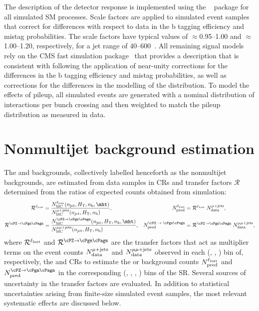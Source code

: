 The description of the detector response is implemented using the
\GEANTfour~\cite{geant} package for all simulated SM processes. Scale
factors are applied to simulated event samples that correct for
differences with respect to data in the b tagging efficiency and
mistag probabilities. The scale factors have typical values of
${\approx}$0.95--1.00 and ${\approx}$1.00--1.20, respectively, for a
jet \pt range of 40--600\GeV~\cite{BTV-16-002}. All remaining signal
models rely on the CMS fast simulation package~\cite{fastsim} that
provides a description that is consistent with \GEANTfour following
the application of near-unity corrections for the differences in the b
tagging efficiency and mistag probabilities, as well as corrections
for the differences in the modelling of the \mht distribution. To
model the effects of pileup, all simulated events are generated with a
nominal distribution of {\Pp\Pp} interactions per bunch crossing and then
weighted to match the pileup distribution as measured in data.

\section{Nonmultijet background estimation}
\label{sec:ewk}

The \lost and \znunuj backgrounds, collectively labelled henceforth as
the nonmultijet backgrounds, are estimated from data samples in CRs
and transfer factors $\mathcal{R}$ determined from the ratios of
expected counts obtained from simulation:
\begin{align}
  \tf^{\lost} & =
  \frac{N^{\lost}_\text{MC}(\njet, \scalht, \nb, \mht)}
  {N^{\mj}_\text{MC}(\njet, \scalht, \nb)\hfill},
  &
  N^{\lost}_\text{pred}  & =
  \tf^{\lost} \; N^{\mj}_\text{data},
  \\
  \tf^{\znunu}  & = 
  \frac{N^{\znunu}_\text{MC}(\njet, \scalht, \nb, \mht)}
  {N^{\mmj}_\text{MC}(\njet, \scalht, \nb)\hfill},
  &
  N^\text{\znunu}_\text{pred}  & = 
  \tf^{\znunu} \; N^{\mmj}_\text{data},
\end{align}
where $\mathcal{R}^{\ell_\text{lost}}$ and $\tf^{\znunu}$ are the transfer factors that
act as multiplier terms on the event counts $N^{\mu\text{+\ensuremath{\text{jets}}}}_\text{data}$ and
$N^{\mu\mu\text{+\ensuremath{\text{jets}}}}_\text{data}$ observed in each (\njet, \scalht, \nb) bin of,
respectively, the \mj and \mmj CRs to estimate the \lost or \znunuj
background counts $N^{\ell_\text{lost}}_\text{pred}$ and $N^{\znunu}_\text{pred}$
in the corresponding (\njet, \scalht, \nb, \mht) bins of the
SR. Several sources of uncertainty in the transfer factors are
evaluated.  In addition to statistical uncertainties arising from
finite-size simulated event samples, the most relevant systematic
effects are discussed below.

